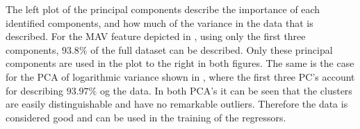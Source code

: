 The left plot of the principal components describe the importance of each identified components, and how much of the variance in the data that is described. For the MAV feature depicted in , using only the first three components, $93.8\%$ of the full dataset can be described. Only these principal components are used in the plot to the right in both figures. The same is the case for the PCA of logarithmic variance shown in , where the first three PC's account for describing $93.97\%$ og the data. In both PCA's it can be seen that the clusters are easily distinguishable and have no remarkable outliers. Therefore the data is considered good and can be used in the training of the regressors.


